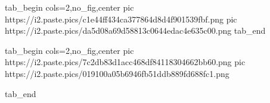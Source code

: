  
 
 
 
 
\zzSecCmtScr

\ifcmt
  tab_begin cols=2,no_fig,center
     pic https://i2.paste.pics/c1e44ff434ca377864d8d4f901539fbf.png
		 pic https://i2.paste.pics/da5d08a69d58813c0644edac4e635c00.png
  tab_end
\fi

\ifcmt
  tab_begin cols=2,no_fig,center
	pic https://i2.paste.pics/7c2db83d1acc468df84118304662bb60.png
	pic https://i2.paste.pics/019100a05b6946fb51ddb889fd688fc1.png

  tab_end
\fi
